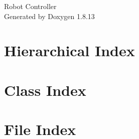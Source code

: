 \documentclass[twoside]{book}
\newcommand{\+}{\discretionary{\mbox{\scriptsize$\hookleftarrow$}}{}{}}
\newcommand{\clearemptydoublepage}{%
  \newpage{\pagestyle{empty}\cleardoublepage}%
}
\begin{document}
\hypersetup{pageanchor=false,
             bookmarksnumbered=true,
             pdfencoding=unicode
            }
\begin{titlepage}
\vspace*{7cm}
\begin{center}%
{\Large Robot Controller }\\
\vspace*{1cm}
{\large Generated by Doxygen 1.8.13}\\
\end{center}
\end{titlepage}
\clearemptydoublepage
{}
\tableofcontents
\clearemptydoublepage
{}
\hypersetup{pageanchor=true}

\chapter{Hierarchical Index}

\chapter{Class Index}

\chapter{File Index}

\end{document}
